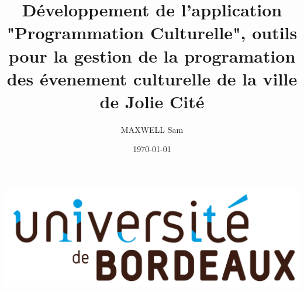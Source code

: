 \documentclass[12pt]{report}
\title{\textbf{Développement de l'application "Programmation Culturelle", outils pour la gestion de la programation des évenement culturelle de la ville de Jolie Cité}}
\author{MAXWELL Sam}
\date{\today}
\begin{document}
    \begin{titlepage}
        \centering
        \includegraphics[left]{bdx-logo-final-final.png}
        \maketitle
    \end{titlepage}
\end{document}
